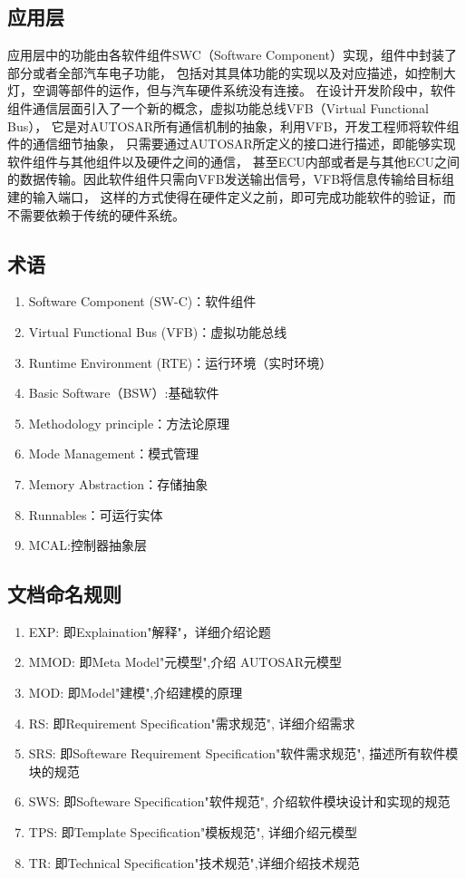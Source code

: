 \subsection{应用层}
应用层中的功能由各软件组件SWC（Software Component）实现，组件中封装了部分或者全部汽车电子功能，
包括对其具体功能的实现以及对应描述，如控制大灯，空调等部件的运作，但与汽车硬件系统没有连接。
在设计开发阶段中，软件组件通信层面引入了一个新的概念，虚拟功能总线VFB（Virtual Functional Bus），
它是对AUTOSAR所有通信机制的抽象，利用VFB，开发工程师将软件组件的通信细节抽象，
只需要通过AUTOSAR所定义的接口进行描述，即能够实现软件组件与其他组件以及硬件之间的通信，
甚至ECU内部或者是与其他ECU之间的数据传输。因此软件组件只需向VFB发送输出信号，VFB将信息传输给目标组建的输入端口，
这样的方式使得在硬件定义之前，即可完成功能软件的验证，而不需要依赖于传统的硬件系统。

\subsection{术语}
\begin{enumerate}
	\item Software Component (SW-C)：软件组件
	\item Virtual Functional Bus (VFB)：虚拟功能总线
	\item Runtime Environment (RTE)：运行环境（实时环境）
	\item Basic Software（BSW）:基础软件
	\item Methodology principle：方法论原理
	\item Mode Management：模式管理
	\item Memory Abstraction：存储抽象
	\item Runnables：可运行实体
	\item MCAL:控制器抽象层
\end{enumerate}

\subsection{文档命名规则}
\begin{enumerate}
	\item EXP: 即Explaination"解释"，详细介绍论题
	\item MMOD: 即Meta Model"元模型",介绍 AUTOSAR元模型
	\item MOD: 即Model"建模",介绍建模的原理
	\item RS: 即Requirement Specification"需求规范", 详细介绍需求
	\item SRS: 即Softeware Requirement Specification"软件需求规范", 描述所有软件模块的规范
	\item SWS: 即Softeware Specification"软件规范", 介绍软件模块设计和实现的规范
	\item TPS: 即Template Specification"模板规范", 详细介绍元模型
	\item TR: 即Technical Specification"技术规范",详细介绍技术规范
\end{enumerate}



